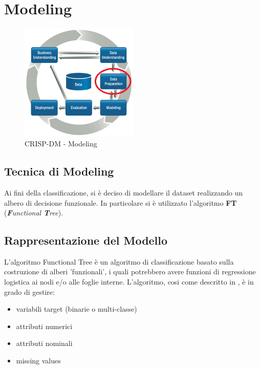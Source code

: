 \chapter{Modeling}

\begin{figure}[hbtp]
	\centering
	\includegraphics[width=0.5\textwidth]{./images/CRISPDM_3.png}
	\caption{CRISP-DM - Modeling}
	\label{CRISPDM_4}
\end{figure}

\section{Tecnica di Modeling}
Ai fini della classificazione, si è deciso di modellare il dataset realizzando un albero di decisione funzionale. In particolare si è utilizzato l'algoritmo \textbf{FT} (\emph{\textbf{F}unctional \textbf{T}ree}).

\section{Rappresentazione del Modello}
L'algoritmo Functional Tree è un algoritmo di classificazione basato sulla costruzione di alberi 'funzionali', i quali potrebbero avere funzioni di regressione logistica ai nodi e/o alle foglie interne. L'algoritmo, cosi come descritto in \cite{Gama:2004:FT:990375.990395}, è in grado di gestire:
\begin{itemize}
	\item variabili target (binarie o multi-classe)
	\item attributi numerici
	\item attributi nominali
	\item missing values
\end{itemize}

